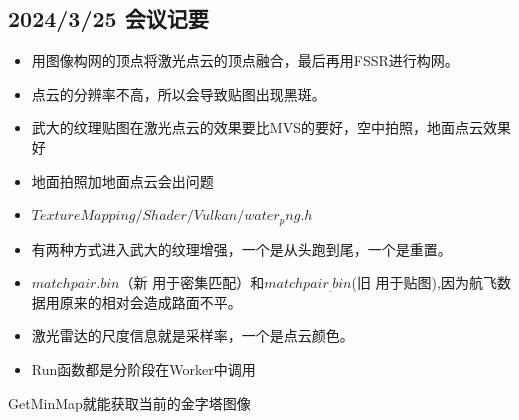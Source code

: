 \subsection{2024/3/25 会议记要}

\begin{itemize}
    \item 用图像构网的顶点将激光点云的顶点融合，最后再用FSSR进行构网。
    \item 点云的分辨率不高，所以会导致贴图出现黑斑。
    \item 武大的纹理贴图在激光点云的效果要比MVS的要好，空中拍照，地面点云效果好
    \item 地面拍照加地面点云会出问题
    \item $ TextureMapping/Shader/Vulkan/water_png.h $
    \item 有两种方式进入武大的纹理增强，一个是从头跑到尾，一个是重置。
    \item $ matchpair.bin $（新 用于密集匹配）和$matchpair_.bin$(旧 用于贴图),因为航飞数据用原来的相对会造成路面不平。
    \item 激光雷达的尺度信息就是采样率，一个是点云颜色。
    \item Run函数都是分阶段在Worker中调用
\end{itemize}

GetMinMap就能获取当前的金字塔图像